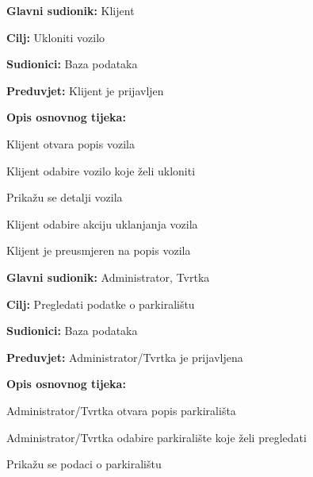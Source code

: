 \noindent {}
\begin{packed_item}
	
	\item \textbf{Glavni sudionik:} Klijent
	\item \textbf{Cilj:} Ukloniti vozilo
	\item \textbf{Sudionici:} Baza podataka
	\item \textbf{Preduvjet:} Klijent je prijavljen
	\item \textbf{Opis osnovnog tijeka:}
	
	\item[] \begin{packed_enum}
		
		\item Klijent otvara popis vozila
		\item Klijent odabire vozilo koje želi ukloniti
		\item Prikažu se detalji vozila
		\item Klijent odabire akciju uklanjanja vozila
		\item Klijent je preusmjeren na popis vozila

	\end{packed_enum}
\end{packed_item}

\noindent {}
\begin{packed_item}
	
	\item \textbf{Glavni sudionik: } Administrator, Tvrtka
	\item \textbf{Cilj:} Pregledati podatke o parkiralištu
	\item \textbf{Sudionici:} Baza podataka
	\item \textbf{Preduvjet:} Administrator/Tvrtka je prijavljena
	\item \textbf{Opis osnovnog tijeka:}
	
	\item[] \begin{packed_enum}
		
		\item Administrator/Tvrtka otvara popis parkirališta
		\item Administrator/Tvrtka odabire parkiralište koje želi pregledati
		\item Prikažu se podaci o parkiralištu
	
	\end{packed_enum}
\end{packed_item}

